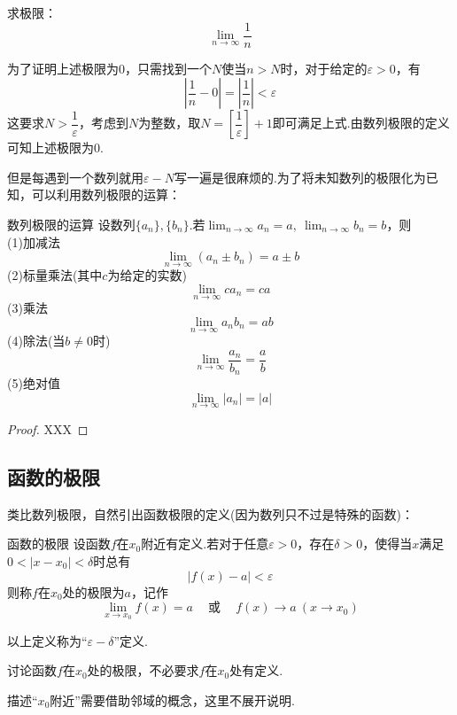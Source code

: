 \documentclass[lang=cn, zihao=5]{elegantbook}
\newcommand{\cor}{~\textit{或}~}
\begin{document}
\begin{example}
	求极限：$$\lim_{n \to \infty} \frac{1}{n}$$
\end{example}
\begin{solution}
	为了证明上述极限为$0$，只需找到一个$N$使当$n > N$时，对于给定的$\varepsilon > 0$，有$$\left| \frac{1}{n}-0 \right| = \left| \frac{1}{n} \right| < \varepsilon$$
	这要求$N>\dfrac{1}{\varepsilon}$，考虑到$N$为整数，取$N=\left[ \dfrac{1}{\varepsilon} \right]+1$即可满足上式.由数列极限的定义可知上述极限为$0$.
\end{solution}

但是每遇到一个数列就用$\varepsilon - N$写一遍是很麻烦的.为了将未知数列的极限化为已知，可以利用数列极限的运算：

\begin{theorem}{数列极限的运算} %
	设数列$\{ a_n \},\{ b_n \}$.若$\lim_{n \to \infty} a_n=a,~\lim_{n \to \infty} b_n=b$，则 \\
	(1)加减法$$\lim_{n \to \infty}{(a_n \pm b_n)} = a \pm b$$
	(2)标量乘法(其中$c$为给定的实数)$$\lim_{n \to \infty}{ca_n}=ca$$
	(3)乘法$$\lim_{n \to \infty}{a_nb_n} = ab$$
	(4)除法(当$b \neq 0$时)$$\lim_{n \to \infty}{\frac{a_n}{b_n}} = \frac{a}{b}$$
	(5)绝对值$$\lim_{n \to \infty}{|a_n|} = |a|$$
\end{theorem}
\begin{proof}
	XXX
\end{proof}

\subsection{函数的极限}

类比数列极限，自然引出函数极限的定义(因为数列只不过是特殊的函数)：

\begin{definition}{函数的极限}
	设函数$f$在$x_0$附近有定义.若对于任意$\varepsilon > 0$，存在$\delta > 0$，使得当$x$满足$0<|x-x_0|<\delta$时总有$$|f(x)-a|<\varepsilon$$
	则称$f$在$x_0$处的极限为$a$，记作$$\lim_{x \to x_0}{f(x)=a} \quad \cor \quad f(x) \to a~(x \to x_0)$$
\end{definition}
\begin{remark}
	以上定义称为“$\varepsilon - \delta$”定义.
\end{remark}
\begin{remark}
	讨论函数$f$在$x_0$处的极限，不必要求$f$在$x_0$处有定义.
\end{remark}
\begin{remark}
	描述“$x_0$附近”需要借助邻域的概念，这里不展开说明.
\end{remark}
\end{document}

